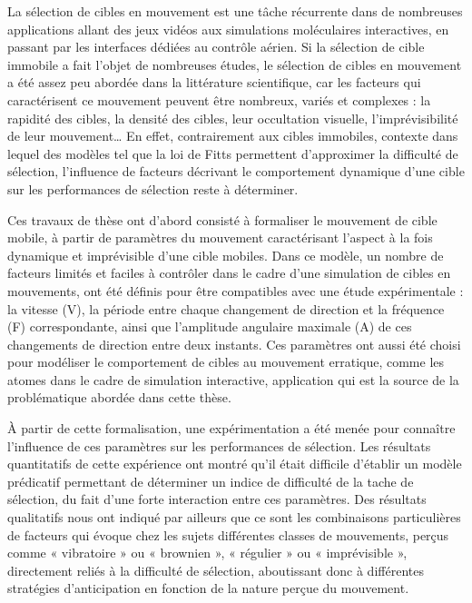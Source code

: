 La sélection de cibles en mouvement est une tâche récurrente dans de nombreuses applications allant des jeux vidéos aux simulations moléculaires interactives, en passant par les interfaces dédiées au contrôle aérien. Si la sélection de cible immobile a fait l’objet de nombreuses études, le sélection de cibles en mouvement a été assez peu abordée dans la littérature scientifique, car les facteurs qui caractérisent ce mouvement peuvent être nombreux, variés et complexes : la rapidité des cibles, la densité des cibles, leur occultation visuelle, l’imprévisibilité de leur mouvement\ldots{} En effet, contrairement aux cibles immobiles, contexte dans lequel des modèles tel que la loi de Fitts permettent d’approximer la difficulté de sélection, l’influence de facteurs décrivant le comportement dynamique d’une cible sur les performances de sélection reste à déterminer.

Ces travaux de thèse ont d’abord consisté à formaliser le mouvement de cible mobile, à partir de paramètres du mouvement caractérisant l’aspect à la fois dynamique et imprévisible d’une cible mobiles. Dans ce modèle, un nombre de facteurs limités et faciles à contrôler dans le cadre d’une simulation de cibles en mouvements, ont été définis pour être compatibles avec une étude expérimentale : la vitesse (V), la période entre chaque changement de direction et la fréquence (F) correspondante, ainsi que l’amplitude angulaire maximale (A) de ces changements de direction entre deux instants. Ces paramètres ont aussi été choisi pour modéliser le comportement de cibles au mouvement erratique, comme les atomes dans le cadre de simulation interactive, application qui est la source de la problématique abordée dans cette thèse.

À partir de cette formalisation, une expérimentation a été menée pour connaître l’influence de ces paramètres sur les performances de sélection. Les résultats quantitatifs de cette expérience ont montré qu’il était difficile d’établir un modèle prédicatif permettant de déterminer un indice de difficulté de la tache de sélection, du fait d’une forte interaction entre ces paramètres. Des résultats qualitatifs nous ont indiqué par ailleurs que ce sont les combinaisons particulières de facteurs qui évoque chez les sujets différentes classes de mouvements, perçus comme « vibratoire » ou « brownien », « régulier » ou « imprévisible », directement reliés à la difficulté de sélection, aboutissant donc à différentes stratégies d’anticipation en fonction de la nature perçue du mouvement.

